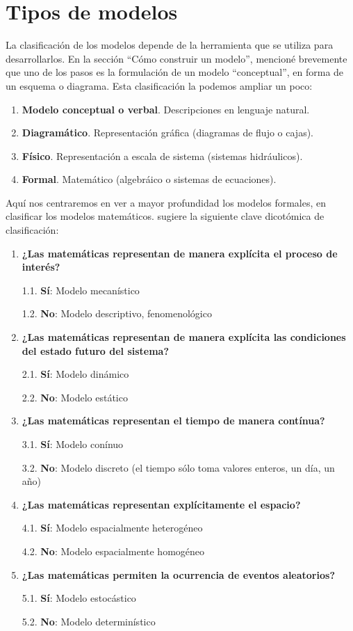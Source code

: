 \documentclass[
]{book}
\providecommand{\tightlist}{%
  \setlength{\itemsep}{0pt}\setlength{\parskip}{0pt}}
\begin{document}
\hypertarget{tipos-de-modelos}{%
\section{Tipos de modelos}\label{tipos-de-modelos}}

La clasificación de los modelos depende de la herramienta que se utiliza para desarrollarlos. En la sección ``Cómo construir un modelo'', mencioné brevemente que uno de los pasos es la formulación de un modelo ``conceptual'', en forma de un esquema o diagrama. Esta clasificación la podemos ampliar un poco:

\begin{enumerate}
\def\labelenumi{\arabic{enumi}.}
\tightlist
\item
  \textbf{Modelo conceptual o verbal}. Descripciones en lenguaje natural.
\item
  \textbf{Diagramático}. Representación gráfica (diagramas de flujo o cajas).
\item
  \textbf{Físico}. Representación a escala de sistema (sistemas hidráulicos).
\item
  \textbf{Formal}. Matemático (algebráico o sistemas de ecuaciones).
\end{enumerate}

Aquí nos centraremos en ver a mayor profundidad los modelos formales, en clasificar los modelos matemáticos. \citet{haefner1998modeling} sugiere la siguiente clave dicotómica de clasificación:

\begin{enumerate}
\def\labelenumi{\arabic{enumi}.}
\item
  \textbf{¿Las matemáticas representan de manera explícita el proceso de interés?}

  1.1. \textbf{Sí}: Modelo mecanístico

  1.2. \textbf{No}: Modelo descriptivo, fenomenológico
\item
  \textbf{¿Las matemáticas representan de manera explícita las condiciones del estado futuro del sistema?}

  2.1. \textbf{Sí}: Modelo dinámico

  2.2. \textbf{No}: Modelo estático
\item
  \textbf{¿Las matemáticas representan el tiempo de manera contínua?}

  3.1. \textbf{Sí}: Modelo conínuo

  3.2. \textbf{No}: Modelo discreto (el tiempo sólo toma valores enteros, un día, un año)
\item
  \textbf{¿Las matemáticas representan explícitamente el espacio?}

  4.1. \textbf{Sí}: Modelo espacialmente heterogéneo

  4.2. \textbf{No}: Modelo espacialmente homogéneo
\item
  \textbf{¿Las matemáticas permiten la ocurrencia de eventos aleatorios?}

  5.1. \textbf{Sí}: Modelo estocástico

  5.2. \textbf{No}: Modelo determinístico
\end{enumerate}
\end{document}
